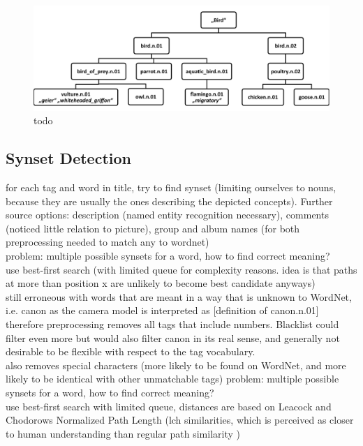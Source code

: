 \begin{figure}
\includegraphics[width=\textwidth]{images/searchtree.pdf}
\caption{todo}
\label{fig_searchtree}
\end{figure}

\subsection{Synset Detection}
for each tag and word in title, try to find synset (limiting ourselves to nouns, because they are usually the ones describing the depicted concepts). Further source options: description (named entity recognition necessary), comments (noticed little relation to picture), group and album names (for both preprocessing needed to match any to wordnet)  \\
problem: multiple possible synsets for a word, how to find correct meaning? \\
use best-first search (with limited queue for complexity reasons. idea is that paths at more than position x are unlikely to become best candidate anyways) \\
still erroneous with words that are meant in a way that is unknown to WordNet, i.e. canon as the camera model is interpreted as [definition of canon.n.01]  \\
therefore preprocessing removes all tags that include numbers. Blacklist could filter even more but would also filter canon in its real sense, and generally not desirable to be flexible with respect to the tag vocabulary.  \\
also removes special characters (more likely to be found on WordNet, and more likely to be identical with other unmatchable tags) 
problem: multiple possible synsets for a word, how to find correct meaning? \\
use best-first search with limited queue, distances are based on Leacock and Chodorows Normalized Path Length (lch similarities, which is perceived as closer to human understanding than regular path similarity \cite{budanitsky01} )

